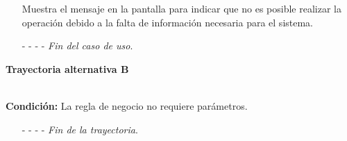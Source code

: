 \begin{enumerate}
	\UCpaso[\UCsist] Muestra el mensaje  en la pantalla  para indicar que no es posible realizar la operación debido a la falta de información necesaria para el sistema.
	\item[- -] - - {\em {Fin del caso de uso}}.%
\end{enumerate}
\hypertarget{CU8-1:TAB}{\textbf{Trayectoria alternativa B}}\\
\noindent \textbf{Condición:} La regla de negocio no requiere parámetros.
\begin{enumerate}
	\UCpaso[\UCactor] Continúa con el paso \ref{CU8.1-P9} de la trayectoria principal.
	\item[- -] - - {\em {Fin de la trayectoria}}.%
\end{enumerate}
	
